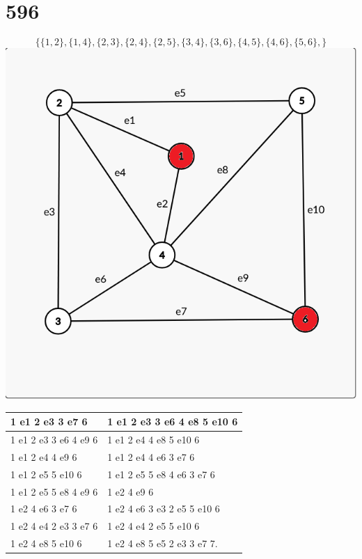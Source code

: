 \documentclass[a4paper, 12pt]{article}
\begin{document}
\section*{596}
\[
       \{\{1,2\},\{1,4\},\{2,3\},\{2,4\},\{2,5\},\{3,4\},\{3,6\},\{4,5\},\{4,6\},\{5,6\},\}
\]
\includegraphics{596.png}\\
\begin{center}
    \begin{tabular}{l | l}
       1 e1 2 e3 3 e7 6 & 1 e1 2 e3 3 e6 4 e8 5 e10 6\\\hline
       1 e1 2 e3 3 e6 4 e9 6 & 1 e1 2 e4 4 e8 5 e10 6\\\hline
       1 e1 2 e4 4 e9 6 & 1 e1 2 e4 4 e6 3 e7 6\\\hline
       1 e1 2 e5 5 e10 6 & 1 e1 2 e5 5 e8 4 e6 3 e7 6\\\hline
       1 e1 2 e5 5 e8 4 e9 6 & 1 e2 4 e9 6\\\hline
       1 e2 4 e6 3 e7 6 & 1 e2 4 e6 3 e3 2 e5 5 e10 6\\\hline
       1 e2 4 e4 2 e3 3 e7 6 & 1 e2 4 e4 2 e5 5 e10 6\\\hline
       1 e2 4 e8 5 e10 6 & 1 e2 4 e8 5 e5 2 e3 3 e7 7.        
    \end{tabular}
\end{center}
\newpage
\end{document}
